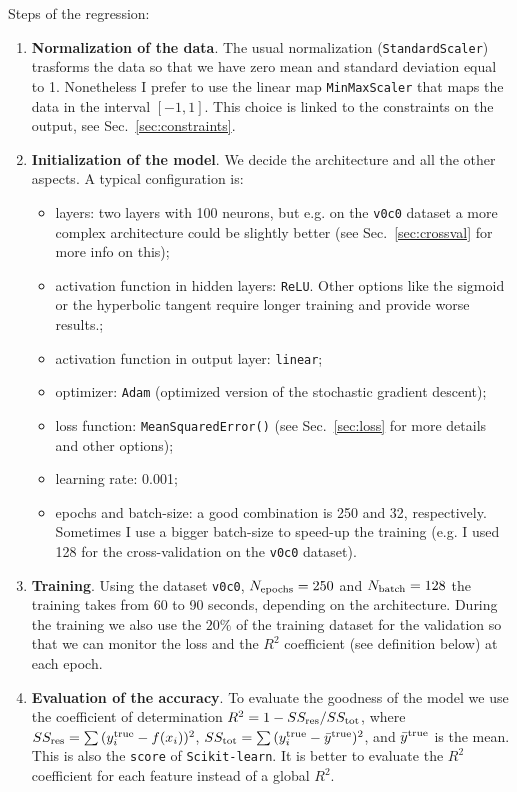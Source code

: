 \documentclass[prd,aps,twocolumn,a4paper,showkeys,nofootinbib]{article}
\begin{document}
Steps of the regression:
\begin{enumerate}
\item \textbf{Normalization of the data}. The usual normalization (\texttt{StandardScaler})
trasforms the data so that we have zero mean and standard deviation equal to 1. 
Nonetheless I prefer to use the 
linear map \texttt{MinMaxScaler} that maps the data in the interval $[-1,1]$. 
This choice is linked to the constraints on the output, see Sec.~\ref{sec:constraints}. 

\item \textbf{Initialization of the model}. We decide the architecture and all the other aspects. 
A typical configuration is:
\begin{itemize}
\item layers: two layers with 100 neurons, but e.g. on the \texttt{v0c0}
dataset a more complex architecture could be slightly better 
(see Sec.~\ref{sec:crossval} for more info on this);
\item activation function in hidden layers: \texttt{ReLU}. Other options like the sigmoid 
or the hyperbolic tangent require longer training and provide worse results.;
\item activation function in output layer: \texttt{linear};
\item optimizer: \texttt{Adam} (optimized version of the stochastic gradient descent);
\item loss function: \texttt{MeanSquaredError()} (see Sec.~\ref{sec:loss} for more details 
and other options);
\item learning rate: 0.001;
\item epochs and batch-size: a good combination is 250 and 32, respectively. Sometimes I use a
bigger batch-size to speed-up the training (e.g. I used 128 for the cross-validation on
the \texttt{v0c0} dataset).
\end{itemize}

\item \textbf{Training}. Using  the dataset \texttt{v0c0}, $N_{\rm epochs}=250$ and 
$N_{\rm batch}=128$ the training
takes from 60 to 90 seconds, depending on the architecture. During the training we also 
use the $20\%$ of the training dataset for the validation so that
we can monitor the loss and the $R^2$ coefficient (see definition below) at each epoch.

\item \textbf{Evaluation of the accuracy}. To evaluate the goodness of the model 
we use the coefficient of determination $R^2=1-SS_{\rm res}/SS_{\rm tot}$, where
$SS_{\rm res}=\sum{(y^{\rm true}_i-f(x_i))^2}$, 
$SS_{\rm tot}=\sum{(y^{\rm true}_i - \bar{y}^{\rm true})^2}$, 
and $\bar{y}^{\rm true}$ is the mean. This is also the \texttt{score} 
of \texttt{Scikit-learn}. It is better to evaluate the $R^2$ coefficient
for each feature instead of a global $R^2$. 
\end{enumerate}
\end{document}
